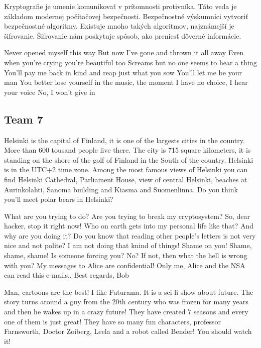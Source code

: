 \documentclass[a4paper,11pt]{article}
\begin{document}
\begin{displayquote}
Kryptografie je umenie komunikovať v prítomnosti protivníka. Táto veda je základom modernej počítačovej bezpečnosti. Bezpečnostné výskumníci vytvoriť bezpečnostné algoritmy. Existuje mnoho takých algoritmov, najznámejší je šifrovanie. Šifrovanie nám poskytuje spôsob, ako preniesť dôverné informácie.
\end{displayquote}

\begin{displayquote}
Never opened myself this way
But now I've gone and thrown it all away
Even when you're crying you're beautiful too
Screams but no one seems to hear a thing
You'll pay me back in kind and reap just what you sow
You'll let me be your man
You better lose yourself in the music, the moment
I have no choice, I hear your voice
No, I won't give in
\end{displayquote}

\newpage
\subsection{Team 7}
\begin{displayquote}
Helsinki is the capital of Finland, it is one of the largests cities in the country.
More than 600 tousand people live there. The city is 715 square kilometers,
it is standing on the shore of the golf of Finland in the South of the country.
Helsinki is in the UTC+2 time zone.
Among the most famous views of Helsinki you can find  Helsinki Cathedral, Parliament House,
view of central Helsinki, beaches at Aurinkolahti,  Sanoma building and Kiasma and Suomenlinna.
Do you think you'll meet polar bears in Helsinki?
\end{displayquote}

\begin{displayquote}
What are you trying to do? Are you trying to break my cryptosystem?
So, dear hacker, stop it right now!
Who on earth gets into my personal life like that? And why are you doing it?
Do you know that reading other people's letters is not very nice and not polite?
I am not doing that knind of things! Shame on you! Shame, shame, shame!
Is someone forcing you? No? If not, then what the hell is wrong with you?
My messages to Alice are confidential! Only me, Alice and the NSA can read this e-mails..
Best regards,
Bob
\end{displayquote}

\begin{displayquote}
Man, cartoons are the best! I like Futurama.
It is a sci-fi show about future. The story turns around a guy from the 20th century
who was frozen for many years and then he wakes up in a crazy future!
They have created 7 seasons and every one of them is just great!
They have so many fun characters, professor Farnsworth, Doctor Zoiberg, Leela
and a robot called Bender! You should watch it!
\end{displayquote}
\end{document}
